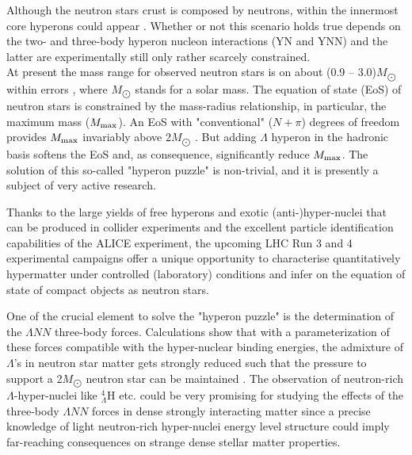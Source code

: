 Although the neutron stars crust is composed by neutrons, within the innermost core hyperons could appear \cite{RMP-88-035004-2016}.
Whether or not this scenario holds true depends on the two- and three-body hyperon nucleon interactions (YN and YNN) and the latter are experimentally still only rather scarcely constrained. \\
At present the mass range for observed neutron stars is on about (0.9 --  3.0)$M_{\bigodot}$ within errors \cite{ARNPS-62-485-2012}, where $M_{\bigodot}$ stands for a solar mass. 
The equation of state (EoS)  of neutron stars is constrained by the mass-radius relationship, in particular, the maximum mass ($M_{\scriptsize{\mbox{max}}}$). An EoS with "conventional" ($N+\pi$) degrees of freedom provides $M_{\scriptsize{\mbox{max}}}$ invariably above 2$M_{\bigodot}$ \cite{HyperfineInteract-233-131-2015,Nature-467-1081-2010,AstrophysJ-832-167-2016}. 
But adding $\Lambda$ hyperon in the hadronic basis softens the EoS and, as consequence, significantly reduce $M_{\scriptsize{\mbox{max}}}$. 
The solution of this so-called "hyperon puzzle" is non-trivial, and it is presently a subject of very active research.

Thanks to the large yields of free hyperons and  exotic (anti-)hyper-nuclei that can be produced in collider experiments and the excellent particle identification capabilities of the ALICE experiment, the upcoming LHC Run 3 and 4 experimental campaigns
offer a unique opportunity to characterise quantitatively hypermatter under controlled (laboratory) conditions and infer on the equation of state of compact objects as neutron stars.

One of the crucial  element to solve the "hyperon puzzle" is the determination of the $\Lambda NN$ three-body forces. 
Calculations show that with a parameterization of these forces compatible with the hyper-nuclear binding energies, the admixture of $\Lambda$'s in neutron star matter gets strongly reduced such that the pressure to support a 2$M_{\bigodot}$ neutron star can be maintained \cite{Lonardoni:2014bwa}. 
The observation of neutron-rich $\Lambda$-hyper-nuclei like $^{4}_{\Lambda}\mbox{H}$ etc. could be very promising for studying the effects of the
three-body $\Lambda NN$ forces in dense strongly interacting matter since a precise knowledge of light neutron-rich hyper-nuclei energy level structure could imply far-reaching consequences on strange dense stellar matter properties.

